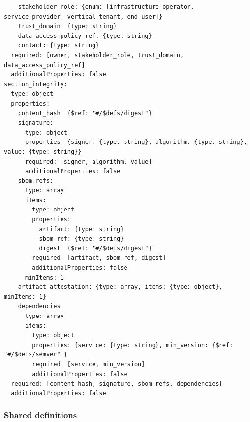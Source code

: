 \begin{verbatim}
    stakeholder_role: {enum: [infrastructure_operator, service_provider, vertical_tenant, end_user]}
    trust_domain: {type: string}
    data_access_policy_ref: {type: string}
    contact: {type: string}
  required: [owner, stakeholder_role, trust_domain, data_access_policy_ref]
  additionalProperties: false
section_integrity:
  type: object
  properties:
    content_hash: {$ref: "#/$defs/digest"}
    signature:
      type: object
      properties: {signer: {type: string}, algorithm: {type: string}, value: {type: string}}
      required: [signer, algorithm, value]
      additionalProperties: false
    sbom_refs:
      type: array
      items:
        type: object
        properties:
          artifact: {type: string}
          sbom_ref: {type: string}
          digest: {$ref: "#/$defs/digest"}
        required: [artifact, sbom_ref, digest]
        additionalProperties: false
      minItems: 1
    artifact_attestation: {type: array, items: {type: object}, minItems: 1}
    dependencies:
      type: array
      items:
        type: object
        properties: {service: {type: string}, min_version: {$ref: "#/$defs/semver"}}
        required: [service, min_version]
        additionalProperties: false
  required: [content_hash, signature, sbom_refs, dependencies]
  additionalProperties: false
\end{verbatim}

\hypertarget{a.1.3-shared-definitions}{%
\subsubsection{Shared definitions}\label{a.1.3-shared-definitions}}

